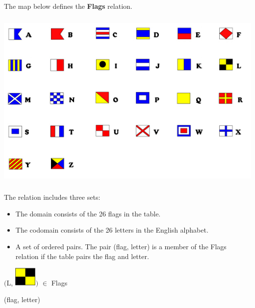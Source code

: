 \documentclass{ximera}
\begin{document}
\begin{definition}
  The map below defines the \textbf{Flags} relation.
  
  

    \includegraphics[width=536px,height=338px]{pics/flags/flag_letter.png}

  
 

  The  relation includes three sets:
    \begin{itemize}
    \item The domain consists of the 26 flags in the table.
    \item The codomain consists of the 26 letters in the English alphabet.
    \item A set of ordered pairs. The pair (flag, letter) is a member of the Flags relation if the table pairs the flag and letter.
    \end{itemize}

  
\end{definition}



\begin{exercise}

 $\bigg($L, {\includegraphics[width=42px,height=36px]{pics/flags/L.png}}$\bigg)$ $\in$ Flags 

  \begin{multipleChoice}
  \end{multipleChoice}
  \begin{feedback}
(flag, letter)
  \end{feedback}
\end{exercise}
\end{document}

